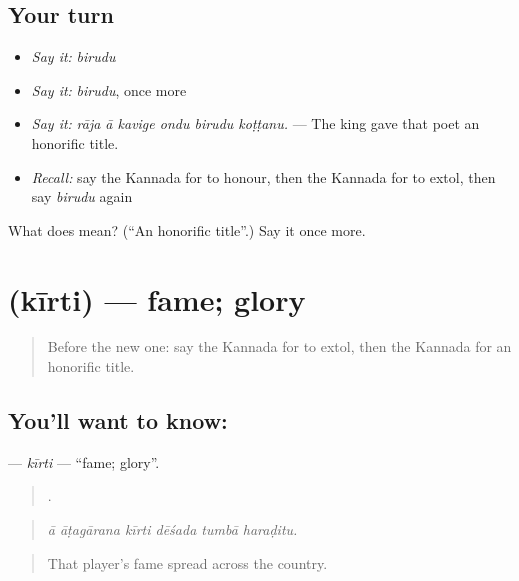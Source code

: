 \subsection*{Your turn}
\begin{itemize}
\raggedright
  \item \emph{Say it:} \emph{birudu}
  \item \emph{Say it:} \emph{birudu}, once more
  \item \emph{Say it:} \emph{rāja ā kavige ondu birudu koṭṭanu.} — The king gave that poet an honorific title.
  \item \emph{Recall:} say the Kannada for to honour, then the Kannada for to extol, then say \emph{birudu} again
\end{itemize}

\begin{tcolorbox}[breakable,colback=teal!4,colframe=teal!35!black,title={Before you move on}]
What does  mean? (\textquotedblleft{}An honorific title\textquotedblright{}.) Say it once more.
\end{tcolorbox}
\section[\texorpdfstring{\kn{ಕೀರ್ತಿ} (kīrti)}{ಕೀರ್ತಿ (kīrti)}]{ (kīrti) — fame; glory}

\label{lesson:KA-C350-kirti}



\begin{quote}
Before the new one: say the Kannada for to extol, then the Kannada for an honorific title.
\end{quote}

\subsection*{You'll want to know: }
\textbf{} — \emph{kīrti} — \textquotedblleft{}fame; glory\textquotedblright{}.

\begin{quote}
     .
\end{quote}

\begin{quote}
\emph{ā āṭagārana kīrti dēśada tumbā haraḍitu.}
\end{quote}

\begin{quote}
That player's fame spread across the country.
\end{quote}

